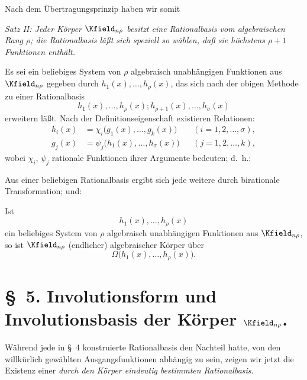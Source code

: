 \documentclass[11pt]{article}
\begin{document}
Nach dem Übertragungsprinzip haben wir somit

\emph{Satz II: Jeder Körper $\Kfield_{n\rho}$ besitzt eine Rationalbasis vom algebraischen Rang $\rho$; die Rationalbasis läßt sich speziell so wählen, daß sie höchstens $\rho+1$ Funktionen enthält.}

Es sei ein beliebiges System von $\rho$ algebraisch unabhängigen Funktionen aus $\Kfield_{n\rho}$ gegeben durch $h_1(x),\ldots,h_\rho(x)$, das sich nach der obigen Methode zu einer Rationalbasis
\[
  h_1(x),\ldots,h_\rho(x);
  h_{\rho+1}(x),\ldots,h_\sigma(x)
\]
erweitern läßt. Nach der Definitionseigenschaft existieren Relationen:
\[
\begin{aligned}
  h_i(x)&=\chi_i\bigl(g_1(x),\ldots,g_k(x)\bigr)
    &&(i=1,2,\ldots,\sigma),\\
  g_j(x)&=\psi_j\bigl(h_1(x),\ldots,h_\sigma(x)\bigr)
    &&(j=1,2,\ldots,k),
\end{aligned}
\]
wobei $\chi_i$, $\psi_j$ rationale Funktionen ihrer Argumente bedeuten; d.~h.:

Aus einer beliebigen Rationalbasis ergibt sich jede weitere durch birationale Transformation; und:

Ist
\[
  h_1(x),\ldots,h_\rho(x)
\]
ein beliebiges System von $\rho$ algebraisch unabhängigen Funktionen aus $\Kfield_{n\rho}$, so ist $\Kfield_{n\rho}$ (endlicher) algebraischer Körper über
\[
  \Omega\bigl(h_1(x),\ldots,h_\rho(x)\bigr).
\]

\section*{\S\ 5. Involutionsform und Involutionsbasis der Körper $\Kfield_{n\rho}$.}

Während jede in \S\ 4 konstruierte Rationalbasis den Nachteil hatte, von den willkürlich gewählten Ausgangsfunktionen abhängig zu sein, zeigen wir jetzt die Existenz einer \emph{durch den Körper eindeutig bestimmten Rationalbasis}.
\end{document}
